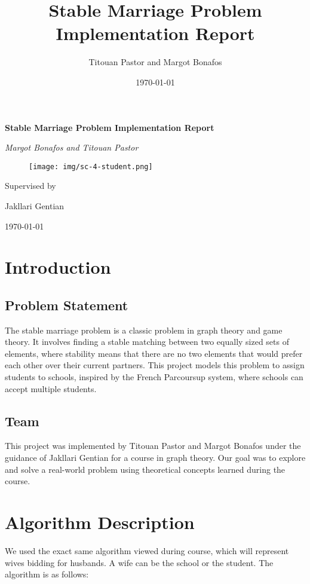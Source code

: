 \documentclass{article}
\title{Stable Marriage Problem Implementation Report}
\author{Titouan Pastor and Margot Bonafos}
\date{\today}
\begin{document}
\begin{titlepage}
    \centering
    \vspace*{1in}
    {\huge\bfseries Stable Marriage Problem Implementation Report\par}
    \vspace{1.5in}
    {\Large\itshape Margot Bonafos and Titouan Pastor\par}
    \begin{figure}[h]
        \centering
        \texttt{[image: img/sc-4-student.png]}
    \end{figure}
    \vfill
    Supervised by\par
    Jakllari Gentian\par
    \vfill
    {\large \today\par}
\end{titlepage}

\tableofcontents
\newpage

\section{Introduction}

\subsection{Problem Statement}
\hspace{0.5cm}
The stable marriage problem is a classic problem in graph theory and game theory. It involves finding a stable matching between two equally sized sets of elements, where stability means that there are no two elements that would prefer each other over their current partners. This project models this problem to assign students to schools, inspired by the French Parcoursup system, where schools can accept multiple students.

\subsection{Team}
\hspace{0.5cm}
This project was implemented by Titouan Pastor and Margot Bonafos under the guidance of Jakllari Gentian for a course in graph theory. Our goal was to explore and solve a real-world problem using theoretical concepts learned during the course.

\section{Algorithm Description}
\hspace{0.5cm}
We used the exact same algorithm viewed during course, which will represent wives bidding for husbands. A wife can be the school or the student. The algorithm is as follows:
\end{document}
